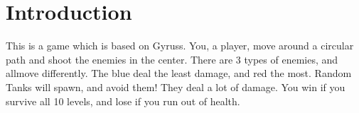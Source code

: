 \hypertarget{index_intro_sec}{}\section{Introduction}\label{index_intro_sec}
This is a game which is based on Gyruss. You, a player, move around a circular path and shoot the enemies in the center. There are 3 types of enemies, and allmove differently. The blue deal the least damage, and red the most. Random Tanks will spawn, and avoid them! They deal a lot of damage. You win if you survive all 10 levels, and lose if you run out of health. 